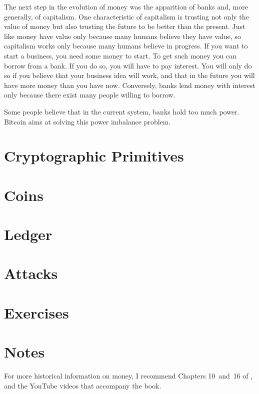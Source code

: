 The next step in the evolution of money was the apparition of banks and, more generally, of capitalism.
One characteristic of capitalism is trusting not only the value of money but also trusting the future to be better than the present.
Just like money have value only because many humans believe they have value, so capitalism works only because many humans believe in progress.
If you want to start a business, you need some money to start.
To get such money you can borrow from a bank.
If you do so, you will have to pay interest.
You will only do so if you believe that your business idea will work, and that in the future you will have more money than you have now.
Conversely, banks lend money with interest only because there exist many people willing to borrow.

Some people believe that in the current system, banks hold too much power.
Bitcoin aims at solving this power imbalance problem.


\section{Cryptographic Primitives}

\section{Coins}

\section{Ledger}

\section{Attacks}

\section{Exercises}


\section{Notes}

For more historical information on money, I recommend Chapters 10~and~16 of \citet{sapiens}, and the YouTube videos that accompany the book.


